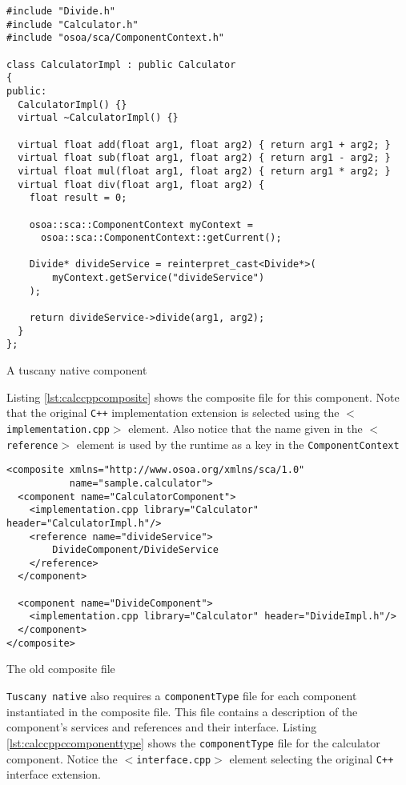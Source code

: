 \begin{listing}[!htbp]
\begin{verbatim}
#include "Divide.h"
#include "Calculator.h"
#include "osoa/sca/ComponentContext.h"

class CalculatorImpl : public Calculator
{
public:
  CalculatorImpl() {}
  virtual ~CalculatorImpl() {}

  virtual float add(float arg1, float arg2) { return arg1 + arg2; }
  virtual float sub(float arg1, float arg2) { return arg1 - arg2; }
  virtual float mul(float arg1, float arg2) { return arg1 * arg2; }
  virtual float div(float arg1, float arg2) {
    float result = 0;

    osoa::sca::ComponentContext myContext = 
      osoa::sca::ComponentContext::getCurrent();

    Divide* divideService = reinterpret_cast<Divide*>(
        myContext.getService("divideService")
    );

    return divideService->divide(arg1, arg2);
  }
};
\end{verbatim}
\caption{A tuscany native component}
\label{lst:calccpp}
\end{listing}

Listing \ref{lst:calccppcomposite} shows the composite file for this component. Note that
the original \texttt{C++} implementation extension is selected using the \texttt{$<$implementation.cpp$>$}
element. Also notice that the name given in the \texttt{$<$reference$>$} element is used by
the runtime as a key in the \texttt{ComponentContext}

\begin{listing}[!htbp]
\begin{verbatim}
<composite xmlns="http://www.osoa.org/xmlns/sca/1.0"
           name="sample.calculator">
  <component name="CalculatorComponent">
    <implementation.cpp library="Calculator" header="CalculatorImpl.h"/>
    <reference name="divideService">
        DivideComponent/DivideService
    </reference>
  </component>
        
  <component name="DivideComponent">
    <implementation.cpp library="Calculator" header="DivideImpl.h"/>
  </component>
</composite>
\end{verbatim}
\caption{The old composite file}
\label{lst:calccppcomposite}
\end{listing}

\texttt{Tuscany native} also requires a \texttt{componentType} file for each component instantiated in the composite file.
This file contains a description of the component's services and references and their interface. Listing
\ref{lst:calccppccomponenttype} shows the \texttt{componentType} file for the calculator component. Notice
the \texttt{$<$interface.cpp$>$} element selecting the original \texttt{C++} interface extension.

